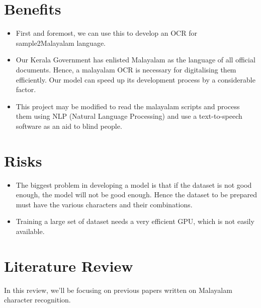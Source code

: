 \documentclass[12pt]{report}
\begin{document}
\clearpage
\section*{Benefits}
\begin{itemize}
\item First and foremost, we can use this to develop an OCR for sample2Malayalam language.


\item Our Kerala Government has enlisted Malayalam as the language of all official documents. Hence, a malayalam OCR is necessary for digitalising them efficiently. Our model can speed up its development process by a considerable factor.
\item This project may be modified to read the malayalam scripts and process them using NLP (Natural Language Processing) and use a text-to-speech software as an aid to blind people.
\end{itemize}

\section*{Risks}
\begin{itemize}
\item The biggest problem in developing a model is that if the dataset is not good enough, the model will not be good enough. Hence the dataset to be prepared must have the various characters and their combinations.
\item Training a large set of dataset needs a very efficient GPU, which is not easily available.

\end{itemize}

\section*{Literature Review}


 In this review, we'll be focusing on previous papers written on Malayalam character recognition. 
\end{document}
